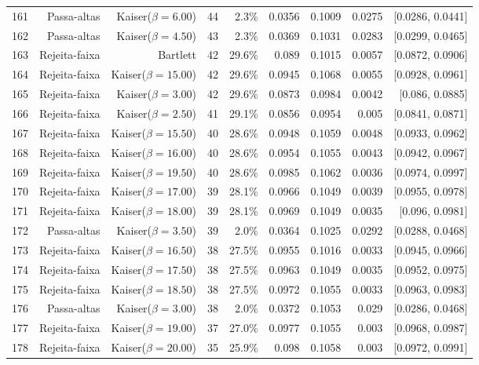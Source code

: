 \begin{longtable}{lrrrrrrrr}
    161 & Passa-altas & Kaiser($\beta=6.00$) & 44 & 2.3\% & 0.0356 & 0.1009 & 0.0275 & [0.0286, 0.0441] \\
    162 & Passa-altas & Kaiser($\beta=4.50$) & 43 & 2.3\% & 0.0369 & 0.1031 & 0.0283 & [0.0299, 0.0465] \\
    163 & Rejeita-faixa & Bartlett & 42 & 29.6\% & 0.089 & 0.1015 & 0.0057 & [0.0872, 0.0906] \\
    164 & Rejeita-faixa & Kaiser($\beta=15.00$) & 42 & 29.6\% & 0.0945 & 0.1068 & 0.0055 & [0.0928, 0.0961] \\
    165 & Rejeita-faixa & Kaiser($\beta=3.00$) & 42 & 29.6\% & 0.0873 & 0.0984 & 0.0042 & [0.086, 0.0885] \\
    166 & Rejeita-faixa & Kaiser($\beta=2.50$) & 41 & 29.1\% & 0.0856 & 0.0954 & 0.005 & [0.0841, 0.0871] \\
    167 & Rejeita-faixa & Kaiser($\beta=15.50$) & 40 & 28.6\% & 0.0948 & 0.1059 & 0.0048 & [0.0933, 0.0962] \\
    168 & Rejeita-faixa & Kaiser($\beta=16.00$) & 40 & 28.6\% & 0.0954 & 0.1055 & 0.0043 & [0.0942, 0.0967] \\
    169 & Rejeita-faixa & Kaiser($\beta=19.50$) & 40 & 28.6\% & 0.0985 & 0.1062 & 0.0036 & [0.0974, 0.0997] \\
    170 & Rejeita-faixa & Kaiser($\beta=17.00$) & 39 & 28.1\% & 0.0966 & 0.1049 & 0.0039 & [0.0955, 0.0978] \\
    171 & Rejeita-faixa & Kaiser($\beta=18.00$) & 39 & 28.1\% & 0.0969 & 0.1049 & 0.0035 & [0.096, 0.0981] \\
    172 & Passa-altas & Kaiser($\beta=3.50$) & 39 & 2.0\% & 0.0364 & 0.1025 & 0.0292 & [0.0288, 0.0468] \\
    173 & Rejeita-faixa & Kaiser($\beta=16.50$) & 38 & 27.5\% & 0.0955 & 0.1016 & 0.0033 & [0.0945, 0.0966] \\
    174 & Rejeita-faixa & Kaiser($\beta=17.50$) & 38 & 27.5\% & 0.0963 & 0.1049 & 0.0035 & [0.0952, 0.0975] \\
    175 & Rejeita-faixa & Kaiser($\beta=18.50$) & 38 & 27.5\% & 0.0972 & 0.1055 & 0.0033 & [0.0963, 0.0983] \\
    176 & Passa-altas & Kaiser($\beta=3.00$) & 38 & 2.0\% & 0.0372 & 0.1053 & 0.029 & [0.0286, 0.0468] \\
    177 & Rejeita-faixa & Kaiser($\beta=19.00$) & 37 & 27.0\% & 0.0977 & 0.1055 & 0.003 & [0.0968, 0.0987] \\
    178 & Rejeita-faixa & Kaiser($\beta=20.00$) & 35 & 25.9\% & 0.098 & 0.1058 & 0.003 & [0.0972, 0.0991] \\

\end{longtable}
